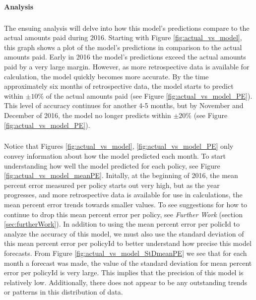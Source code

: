 \documentclass[12pt,letterpaper,titlepage]{article}
\begin{document}
			\paragraph*{Analysis} 
			\subparagraph*{}The ensuing analysis will delve into how this model's predictions compare to the actual amounts paid during 2016. Starting with Figure \ref{fig:actual_vs_model}, this graph shows a plot of the model's predictions in comparison to the actual amounts paid. Early in 2016 the model's predictions exceed the actual amounts paid by a very large margin. However, as more retrospective data is available for calculation, the model quickly becomes more accurate. By the time approximately six months of retrospective data, the model starts to predict within $\pm10\%$ of the actual amounts paid (see Figure \ref{fig:actual_vs_model_PE}). This level of accuracy continues for another 4-5 months, but by November and December of 2016, the model no longer predicts within $\pm20\%$ (see Figure \ref{fig:actual_vs_model_PE}).			
			\subparagraph*{}Notice that Figures \ref{fig:actual_vs_model}, \ref{fig:actual_vs_model_PE} only convey information about how the model predicted each month. To start understanding how well the model predicted for each policy, see Figure \ref{fig:actual_vs_model_meanPE}. Initally, at the beginning of 2016, the mean percent error measured per policy starts out very high, but as the year progresses, and more retrospective data is available for use in calculations, the mean percent error trends towards smaller values. To see suggestions for how to continue to drop this mean percent error per policy, see \emph{Further Work} (section \ref{sec:furtherWork}). In addition to using the mean percent error per policId to analyze the accuracy of this model, we must also use the standard deviation of this mean percent error per policyId to better understand how precise this model forecasts. From Figure \ref{fig:actual_vs_model_StDmeanPE} we see that for each month a forecast was made, the value of the standard deviation for mean percent error per policyId is very large. This implies that the precision of this model is relatively low. Additionally, there does not appear to be any outstanding trends or patterns in this distribution of data.
			
\end{document}
